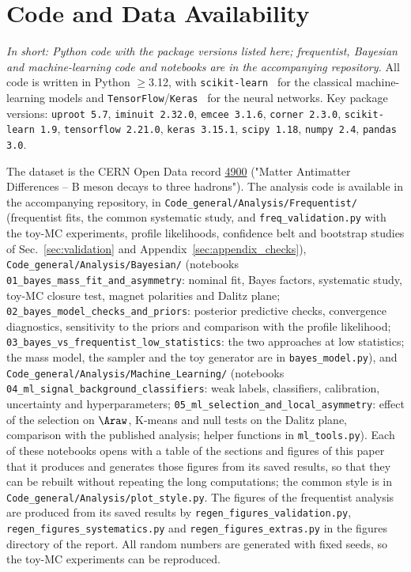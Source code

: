 \section{Code and Data Availability}
\label{sec:code}
\emph{In short: Python code with the package versions listed here; frequentist, Bayesian and machine-learning code and notebooks are in the accompanying repository.}
All code is written in Python $\geq$3.12, with \texttt{scikit-learn}~\cite{sklearn} for the classical machine-learning models and \texttt{TensorFlow}/\texttt{Keras}~\cite{tensorflow} for the neural networks. Key package versions: \texttt{uproot 5.7}, \texttt{iminuit 2.32.0}, \texttt{emcee 3.1.6}, \texttt{corner 2.3.0}, \texttt{scikit-learn 1.9}, \texttt{tensorflow 2.21.0}, \texttt{keras 3.15.1}, \texttt{scipy 1.18}, \texttt{numpy 2.4}, \texttt{pandas 3.0}.

The dataset is the CERN Open Data record \href{https://opendata.cern.ch/record/4900}{4900} ("Matter Antimatter Differences -- B meson decays to three hadrons"). The analysis code is available in the accompanying repository, in \texttt{Code\_general/Analysis/Frequentist/} (frequentist fits, the common systematic study, and \texttt{freq\_validation.py} with the toy-MC experiments, profile likelihoods, confidence belt and bootstrap studies of Sec.~\ref{sec:validation} and Appendix~\ref{sec:appendix_checks}), \texttt{Code\_general/Analysis/Bayesian/} (notebooks \texttt{01\_bayes\_mass\_fit\_and\_asymmetry}: nominal fit, Bayes factors, systematic study, toy-MC closure test, magnet polarities and Dalitz plane; \texttt{02\_bayes\_model\_checks\_and\_priors}: posterior predictive checks, convergence diagnostics, sensitivity to the priors and comparison with the profile likelihood; \texttt{03\_bayes\_vs\_frequentist\_low\_statistics}: the two approaches at low statistics; the mass model, the sampler and the toy generator are in \texttt{bayes\_model.py}), and \texttt{Code\_general/Analysis/Machine\_Learning/} (notebooks \texttt{04\_ml\_signal\_background\_classifiers}: weak labels, classifiers, calibration, uncertainty and hyperparameters; \texttt{05\_ml\_selection\_and\_local\_asymmetry}: effect of the selection on $\Araw$, K-means and null tests on the Dalitz plane, comparison with the published analysis; helper functions in \texttt{ml\_tools.py}). Each of these notebooks opens with a table of the sections and figures of this paper that it produces and generates those figures from its saved results, so that they can be rebuilt without repeating the long computations; the common style is in \texttt{Code\_general/Analysis/plot\_style.py}. The figures of the frequentist analysis are produced from its saved results by \texttt{regen\_figures\_validation.py}, \texttt{regen\_figures\_systematics.py} and \texttt{regen\_figures\_extras.py} in the figures directory of the report. All random numbers are generated with fixed seeds, so the toy-MC experiments can be reproduced.
